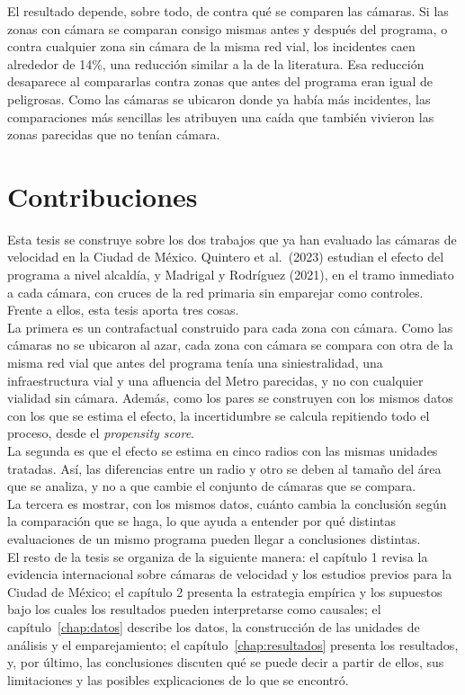 El resultado depende, sobre todo, de contra qué se comparen las cámaras. Si las zonas con cámara se comparan consigo mismas antes y después del programa, o contra cualquier zona sin cámara de la misma red vial, los incidentes caen alrededor de 14\%, una reducción similar a la de la literatura. Esa reducción desaparece al compararlas contra zonas que antes del programa eran igual de peligrosas. Como las cámaras se ubicaron donde ya había más incidentes, las comparaciones más sencillas les atribuyen una caída que también vivieron las zonas parecidas que no tenían cámara.

\section{Contribuciones}
\noindent Esta tesis se construye sobre los dos trabajos que ya han evaluado las cámaras de velocidad en la Ciudad de México. Quintero et al.\ (2023) estudian el efecto del programa a nivel alcaldía, y Madrigal y Rodríguez (2021), en el tramo inmediato a cada cámara, con cruces de la red primaria sin emparejar como controles. Frente a ellos, esta tesis aporta tres cosas.\\

La primera es un contrafactual construido para cada zona con cámara. Como las cámaras no se ubicaron al azar, cada zona con cámara se compara con otra de la misma red vial que antes del programa tenía una siniestralidad, una infraestructura vial y una afluencia del Metro parecidas, y no con cualquier vialidad sin cámara. Además, como los pares se construyen con los mismos datos con los que se estima el efecto, la incertidumbre se calcula repitiendo todo el proceso, desde el \emph{propensity score}.\\

La segunda es que el efecto se estima en cinco radios con las mismas unidades tratadas. Así, las diferencias entre un radio y otro se deben al tamaño del área que se analiza, y no a que cambie el conjunto de cámaras que se compara.\\

La tercera es mostrar, con los mismos datos, cuánto cambia la conclusión según la comparación que se haga, lo que ayuda a entender por qué distintas evaluaciones de un mismo programa pueden llegar a conclusiones distintas.\\

El resto de la tesis se organiza de la siguiente manera: el capítulo 1 revisa la evidencia internacional sobre cámaras de velocidad y los estudios previos para la Ciudad de México; el capítulo 2 presenta la estrategia empírica y los supuestos bajo los cuales los resultados pueden interpretarse como causales; el capítulo~\ref{chap:datos} describe los datos, la construcción de las unidades de análisis y el emparejamiento; el capítulo~\ref{chap:resultados} presenta los resultados, y, por último, las conclusiones discuten qué se puede decir a partir de ellos, sus limitaciones y las posibles explicaciones de lo que se encontró.
